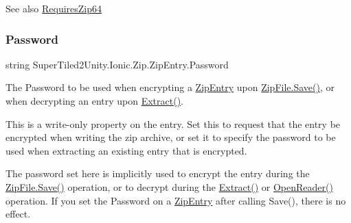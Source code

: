 \begin{DoxySeeAlso}{See also}
\mbox{\hyperlink{class_super_tiled2_unity_1_1_ionic_1_1_zip_1_1_zip_entry_ac89b4cc0aff95adfa926c3649042d539}{Requires\+Zip64}}


\end{DoxySeeAlso}
\mbox{\label{class_super_tiled2_unity_1_1_ionic_1_1_zip_1_1_zip_entry_a4e1ce23f98c2e3a60a2d47a25a243a82}} 
\subsubsection{\texorpdfstring{Password}{Password}}
{\footnotesize\ttfamily string Super\+Tiled2\+Unity.\+Ionic.\+Zip.\+Zip\+Entry.\+Password\hspace{0.3cm}{\ttfamily [set]}}



The Password to be used when encrypting a {\ttfamily \mbox{\hyperlink{class_super_tiled2_unity_1_1_ionic_1_1_zip_1_1_zip_entry}{Zip\+Entry}}} upon {\ttfamily \mbox{\hyperlink{class_super_tiled2_unity_1_1_ionic_1_1_zip_1_1_zip_file_aff8f1b3d07b66481e2629b04017a056f}{Zip\+File.\+Save()}}}, or when decrypting an entry upon \mbox{\hyperlink{class_super_tiled2_unity_1_1_ionic_1_1_zip_1_1_zip_entry_a9d65543aadd23e47e188175412891b42}{Extract()}}. 

This is a write-\/only property on the entry. Set this to request that the entry be encrypted when writing the zip archive, or set it to specify the password to be used when extracting an existing entry that is encrypted. 

The password set here is implicitly used to encrypt the entry during the \mbox{\hyperlink{class_super_tiled2_unity_1_1_ionic_1_1_zip_1_1_zip_file_aff8f1b3d07b66481e2629b04017a056f}{Zip\+File.\+Save()}} operation, or to decrypt during the \mbox{\hyperlink{class_super_tiled2_unity_1_1_ionic_1_1_zip_1_1_zip_entry_a9d65543aadd23e47e188175412891b42}{Extract()}} or \mbox{\hyperlink{class_super_tiled2_unity_1_1_ionic_1_1_zip_1_1_zip_entry_a825692bb86f2c5da7eefc1e9714ae18c}{Open\+Reader()}} operation. If you set the Password on a {\ttfamily \mbox{\hyperlink{class_super_tiled2_unity_1_1_ionic_1_1_zip_1_1_zip_entry}{Zip\+Entry}}} after calling {\ttfamily Save()}, there is no effect. 

